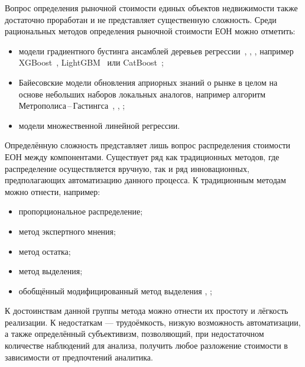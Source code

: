 \documentclass[12pt]{scrartcl}
\begin{document}
Вопрос определения рыночной стоимости единых объектов недвижимости также достаточно проработан и не представляет существенную сложность. Среди рациональных методов определения рыночной стоимости ЕОН можно отметить:
\begin{itemize}
    \item модели градиентного бустинга ансамблей деревьев регрессии~\cite{Hastie2017}, \cite{Li}, \cite{Breiman}, например XGBoost~\cite{XGBoost}, LightGBM~\cite{LightGBM} или CatBoost~\cite{CatBoost};
    \item Байесовские модели обновления априорных знаний о рынке в целом на основе небольших наборов локальных аналогов, например алгоритм Метрополиса\,--\,Гастингса~\cite{Kalos1986}, \cite{Tierney1994}, \cite{Hastings1970};
    \item модели множественной линейной регрессии.
\end{itemize}

Определённую сложность представляет лишь вопрос распределения стоимости ЕОН между компонентами. Существует ряд как традиционных методов, где распределение осуществляется вручную, так и ряд инновационных, предполагающих автоматизацию данного процесса. К традиционным методам можно отнести, например:
\begin{itemize}
    \item пропорциональное распределение;
    \item метод экспертного мнения;
    \item метод остатка;
    \item метод выделения;
    \item обобщённый модифицированный метод выделения \cite{Sloutzkiy_1}, \cite{Leifer_1};
\end{itemize}
К достоинствам данной группы метода можно отнести их простоту и лёгкость реализации. К недостаткам --- трудоёмкость, низкую возможность автоматизации, а также определённый субъективизм, позволяющий, при недостаточном количестве наблюдений для анализа, получить любое разложение стоимости в зависимости от предпочтений аналитика.
\end{document}
